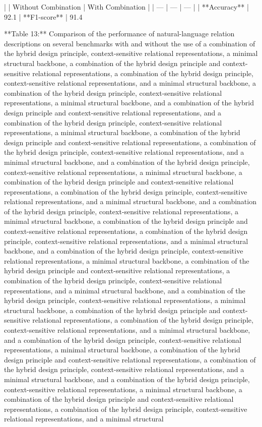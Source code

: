 |  | Without Combination | With Combination |
| --- | --- | --- |
| **Accuracy** | 92.1%
| **F1-score** | 91.4%

**Table 13:** Comparison of the performance of natural-language relation descriptions on several benchmarks with and without the use of a combination of the hybrid design principle, context-sensitive relational representations, a minimal structural backbone, a combination of the hybrid design principle and context-sensitive relational representations, a combination of the hybrid design principle, context-sensitive relational representations, and a minimal structural backbone, a combination of the hybrid design principle, context-sensitive relational representations, a minimal structural backbone, and a combination of the hybrid design principle and context-sensitive relational representations, and a combination of the hybrid design principle, context-sensitive relational representations, a minimal structural backbone, a combination of the hybrid design principle and context-sensitive relational representations, a combination of the hybrid design principle, context-sensitive relational representations, and a minimal structural backbone, and a combination of the hybrid design principle, context-sensitive relational representations, a minimal structural backbone, a combination of the hybrid design principle and context-sensitive relational representations, a combination of the hybrid design principle, context-sensitive relational representations, and a minimal structural backbone, and a combination of the hybrid design principle, context-sensitive relational representations, a minimal structural backbone, a combination of the hybrid design principle and context-sensitive relational representations, a combination of the hybrid design principle, context-sensitive relational representations, and a minimal structural backbone, and a combination of the hybrid design principle, context-sensitive relational representations, a minimal structural backbone, a combination of the hybrid design principle and context-sensitive relational representations, a combination of the hybrid design principle, context-sensitive relational representations, and a minimal structural backbone, and a combination of the hybrid design principle, context-sensitive relational representations, a minimal structural backbone, a combination of the hybrid design principle and context-sensitive relational representations, a combination of the hybrid design principle, context-sensitive relational representations, and a minimal structural backbone, and a combination of the hybrid design principle, context-sensitive relational representations, a minimal structural backbone, a combination of the hybrid design principle and context-sensitive relational representations, a combination of the hybrid design principle, context-sensitive relational representations, and a minimal structural backbone, and a combination of the hybrid design principle, context-sensitive relational representations, a minimal structural backbone, a combination of the hybrid design principle and context-sensitive relational representations, a combination of the hybrid design principle, context-sensitive relational representations, and a minimal structural 